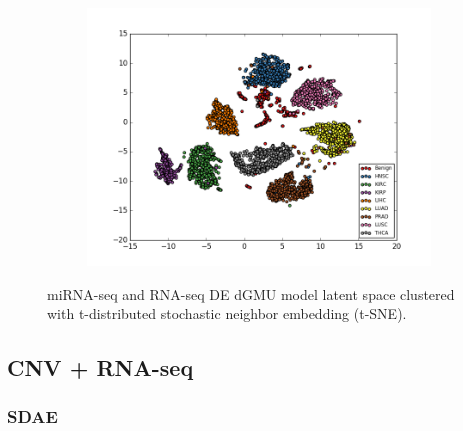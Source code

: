 \begin{figure}[H]
     \centering
     \begin{subfigure}[b]{\textwidth}
         \centering
         \includegraphics[width=\textwidth]{img/m_r/r_m_de_tsne.png}
         \caption{}
     \end{subfigure}
        \caption{miRNA-seq and RNA-seq DE dGMU model latent space clustered with t-distributed stochastic neighbor embedding (t-SNE).}
        \label{fig:r_m_de_tsne}
\end{figure}


\subsection{CNV + RNA-seq}\label{sub:c_r_results}

\subsubsection{SDAE}

